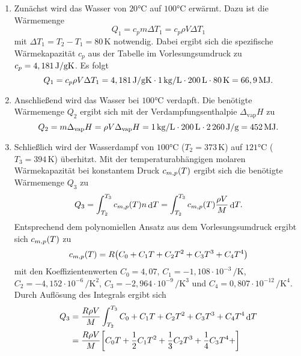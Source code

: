 \documentclass[german,12pt]{homework}
\newcommand{\dd}{\,\differ}
\DeclareMathOperator{\differ}{d}
\DeclarePairedDelimiter{\enbrace}{(}{)}
\DeclarePairedDelimiter{\benbrace}{[}{]}
\begin{document}
    \begin{enumerate}
        \item Zunächst wird das Wasser von \(20\si{\degreeCelsius}\) auf
        \(100\si{\degreeCelsius}\) erwärmt. Dazu ist die Wärmemenge
        \[Q_1 = c_pm{\Delta}T_1 = c_p\rho{V}{\Delta}T_1\]
        mit \({\Delta}T_1 = T_2 - T_1 = 80\,\si{\kelvin}\) notwendig. Dabei
        ergibt sich die spezifische Wärmekapazität \(c_p\) aus der Tabelle im
        Vorlesungsumdruck zu \(c_p = 4,181\,\si{\joule\per{\g\kelvin}}\). Es
        folgt
        \[Q_1 = c_p\rho{V}{\Delta}T_1 = 4,181\,\si{\joule\per{\g\kelvin}} \cdot
        1\,\si{\kg\per{\liter}} \cdot 200\,\si{\liter} \cdot 80\,\si{\kelvin} =
        66,9\,\si{\mega\joule}.\]
        \item Anschließend wird das Wasser bei \(100\si{\degreeCelsius}\)
        verdapft. Die benötigte Wärmemenge \(Q_2\) ergibt sich mit der
        Verdampfungsenthalpie \(\Delta_\text{vap}H\) zu
        \[Q_2 = m\Delta_\text{vap}H = \rho{V}\Delta_\text{vap}H =
        1\,\si{\kg\per{\liter}} \cdot 200\,\si{\liter} \cdot
        2\,260\,\si{\joule\per{\g}} = 452\,\si{\mega\joule}.\]
        \item Schließlich wird der Wasserdampf von \(100\si{\degreeCelsius}\)
        (\(T_2 = 373\,\si{\kelvin}\)) auf \(121\si{\degreeCelsius}\) (\(T_3 =
        394\,\si{\kelvin}\)) überhitzt. Mit der temperaturabhängigen molaren
        Wärmekapazität bei konstantem Druck \(c_{m, p}\enbrace*{T}\) ergibt
        sich die benötigte Wärmemenge \(Q_3\) zu
        \[Q_3 = \int_{T_2}^{T_3}c_{m, p}\enbrace*{T}n{\dd}T =
        \int_{T_2}^{T_3}c_{m, p}\enbrace*{T}\frac{\rho{V}}{M}{\dd}T.\]
        Entsprechend dem polynomiellen Ansatz aus dem Vorlesungsumdruck ergibt
        sich \(c_{m, p}\enbrace*{T}\) zu
        \[c_{m, p}\enbrace*{T} = R\enbrace*{C_0 + C_1T + C_2T^2 + C_3T^3 +
        C_4T^4}\]
        mit den Koeffizientenwerten \(C_0 = 4,07\), \(C_1 = -1,108 \cdot 10^{-3}
        \,\si{\per\kelvin}\), \(C_2 = -4,152 \cdot 10^{-6}
        \,\si{\per\kelvin\squared}\), \(C_3 = -2,964 \cdot 10^{-9}
        \,\si{\per\kelvin\cubed}\) und \(C_4 = 0,807 \cdot 10^{-12}
        \,\si{\per\kelvin\tothe{4}}\). Durch Auflösung des Integrals ergibt sich
        \begin{align*}
            Q_3 &= \frac{R\rho{V}}{M}\int_{T_2}^{T_3}C_0 + C_1T + C_2T^2 +
            C_3T^3 + C_4T^4{\dd}T\\
            &= \frac{R\rho{V}}{M}\benbrace*{C_0T + \frac{1}{2}C_1T^2 +
            \frac{1}{3}C_2T^3 + \frac{1}{4}C_3T^4 +
}
\end{align*}
\end{enumerate}
\end{document}
